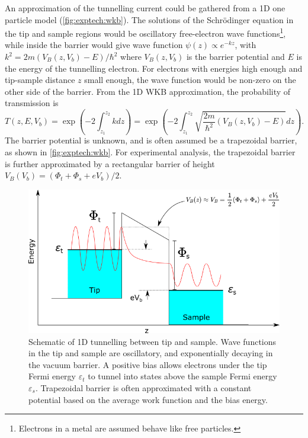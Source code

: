 \sloppy An approximation of the tunnelling current could be gathered from a \ac{1D} one particle model (\autoref{fig:exptech:wkb}). The solutions of the Schr\"odinger equation in the tip and sample regions would be oscillatory free-electron wave functions\footnote{Electrons in a metal are assumed behave like free particles.}, while inside the barrier would give wave function $\psi(z) \propto e^{-kz}$, with $k^2 = 2m({V_B(z,V_b) - E})/\hbar^2$ where $V_B(z,V_b)$ is the barrier potential and $E$ is the energy of the tunnelling electron. For electrons with energies high enough and tip-sample distance $z$ small enough, the wave function would be non-zero on the other side of the barrier. From the \ac{1D} \ac{WKB} approximation, the probability of transmission is
\begin{equation} \label{eq:exptech:transfcn}
T(z,E,V_b) = \exp{\left(-2\int_{z_1} ^{z_2} k dz \right)} = \exp{\left(-2  \int_{z_1}^{z_2} \sqrt{\frac{2m}{\hbar^2}(V_B(z,V_b) - E)} dz \right)}.
\end{equation}
The barrier potential is unknown, and is often assumed be a trapezoidal barrier, as shown in \autoref{fig:exptech:wkb}. For experimental analysis, the trapezoidal barrier is further approximated by a rectangular barrier of height $V_B(V_b) = (\Phi_t + \Phi_s + eV_b)/2$. %


\begin{figure} [t]
    \centering
    \includegraphics[width=\textwidth]{pictures/wkb.png}
    \caption{Schematic of 1D tunnelling between tip and sample. Wave functions in the tip and sample are oscillatory, and exponentially decaying in the vacuum barrier. A positive bias allows electrons under the tip Fermi energy $\varepsilon_t$ to tunnel into states above the sample Fermi energy $\varepsilon_s$.
    Trapezoidal barrier is often approximated with a constant potential based on the average work function and the bias energy.}
    \label{fig:exptech:wkb}
\end{figure}


